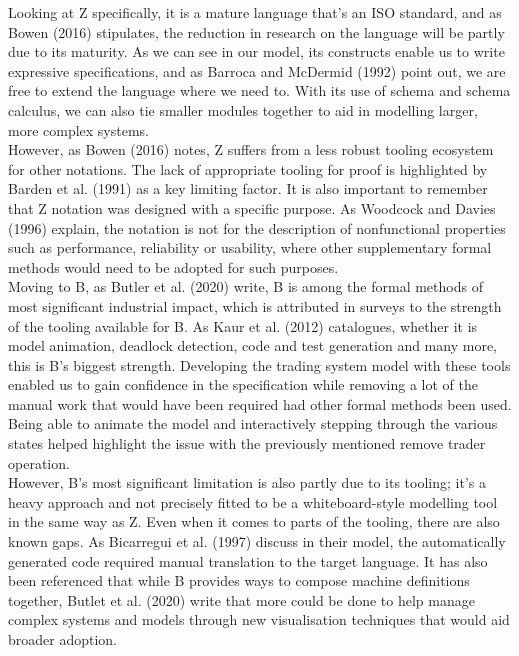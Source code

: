 \documentclass{article}
\begin{document}
Looking at Z specifically, it is a mature language that’s an ISO standard, and as Bowen (2016) stipulates, the reduction in research on the language will be partly due to its maturity. As we can see in our model, its constructs enable us to write expressive specifications, and as Barroca and McDermid (1992) point out, we are free to extend the language where we need to. With its use of schema and schema calculus, we can also tie smaller modules together to aid in modelling larger, more complex systems. \\
\newline
However, as Bowen (2016) notes, Z suffers from a less robust tooling ecosystem for other notations. The lack of appropriate tooling for proof is highlighted by Barden et al. (1991) as a key limiting factor. It is also important to remember that Z notation was designed with a specific purpose. As Woodcock and Davies (1996) explain, the notation is not for the description of nonfunctional properties such as performance, reliability or usability, where other supplementary formal methods would need to be adopted for such purposes. \\
\newline
Moving to B, as Butler et al. (2020) write, B is among the formal methods of most significant industrial impact, which is attributed in surveys to the strength of the tooling available for B. As Kaur et al. (2012) catalogues, whether it is model animation, deadlock detection, code and test generation and many more, this is B's biggest strength. Developing the trading system model with these tools enabled us to gain confidence in the specification while removing a lot of the manual work that would have been required had other formal methods been used. Being able to animate the model and interactively stepping through the various states helped highlight the issue with the previously mentioned remove trader operation. \\
\newline
However, B’s most significant limitation is also partly due to its tooling; it’s a heavy approach and not precisely fitted to be a whiteboard-style modelling tool in the same way as Z. Even when it comes to parts of the tooling, there are also known gaps. As Bicarregui et al. (1997) discuss in their model, the automatically generated code required manual translation to the target language. It has also been referenced that while B provides ways to compose machine definitions together, Butlet et al. (2020) write that more could be done to help manage complex systems and models through new visualisation techniques that would aid broader adoption.
\pagebreak
\end{document}

